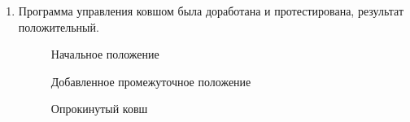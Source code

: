 \begin{enumerate}
\begin{enumerate}
        \item Программа управления ковшом была доработана и протестирована, результат положительный.
        \begin{figure}[H]
	  	  \begin{minipage}[h]{0.31\linewidth}
	  	    \caption{Начальное положение}
	  	  \end{minipage}
	  	  \hfill
	  	  \begin{minipage}[h]{0.31\linewidth}
	  		\caption{Добавленное промежуточное положение}
	  	  \end{minipage}
	  	  \hfill
	  	  \begin{minipage}[h]{0.31\linewidth}
	  	   	\caption{Опрокинутый ковш}
	  	  \end{minipage}
	   \end{figure}


\end{enumerate}
\end{enumerate}
